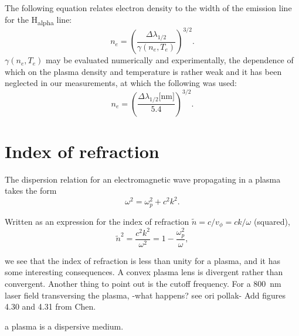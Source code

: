 \documentclass[nofonts]{tufte-book}
\begin{document}
The following equation relates electron density to the width of the emission line for the H\textsubscript{alpha} line:
\begin{equation}
n_e=\left( \frac{\Delta\lambda_{1/2}}{\gamma\left(n_e,T_e\right)}\right)^{3/2}.
\end{equation}
$\gamma\left(n_e,T_e\right)$ may be evaluated numerically and experimentally\cite{Griem2005}, the dependence of which on the plasma density and temperature is rather weak and it has been neglected in our measurements, at which the following was used:
\begin{equation}
n_e=\left( \frac{\Delta\lambda_{1/2}\text{[nm]}}{5.4}\right)^{3/2}. \label{eq:delta_lambda}
\end{equation}
\section{Index of refraction}\label{sec:indexrefraction}

The dispersion relation \cite{Chen1984} for an electromagnetic wave propagating in a plasma takes the form 
\begin{equation}
\omega^2=\omega_p^2+c^2 k^2.
\end{equation}

Written as an expression for the index of refraction $\tilde{n}=c/v_\phi = ck/\omega$ (squared),
\begin{equation}
\tilde{n}^2=\frac{c^2 k^2}{\omega^2}=1-\frac{\omega_p^2}{\omega}, \label{eq:index_of_refraction}
\end{equation}

we see that the index of refraction is less than unity for a plasma, and it has some interesting consequences. A convex plasma lens is divergent rather than convergent. Another thing to point out is the cutoff frequency. For a \SI{800}{\nm} laser field transversing the plasma, {-what happens? see ori pollak-}
Add figures 4.30 and 4.31 from Chen.

a plasma is a dispersive medium.
\end{document}
